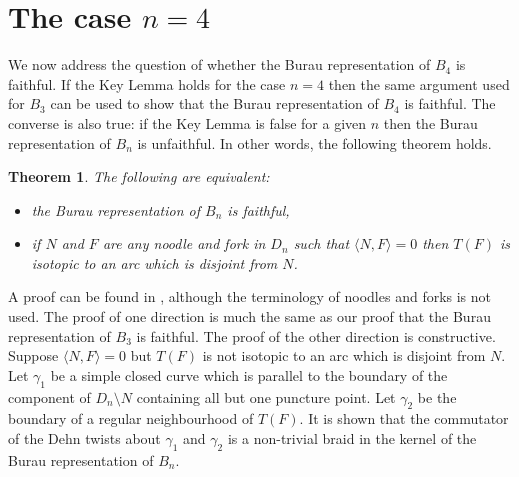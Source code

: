 \documentclass[10pt]{amsart}
\theoremstyle{plain}
\newtheorem{thm}{Theorem}[section]
\theoremstyle{definition}
\begin{document}
\section{The case $n=4$}

We now address the question
of whether the Burau representation of $B_4$ is faithful.
If the Key Lemma holds for the case $n=4$
then the same argument used for $B_3$
can be used to show that the Burau representation of $B_4$ is faithful.
The converse is also true:
if the Key Lemma is false for a given $n$
then the Burau representation of $B_n$ is unfaithful.
In other words, the following theorem holds.

\begin{thm}
\label{faithful}
The following are equivalent:
\begin{itemize}
\item the Burau representation of $B_n$ is faithful,
\item if $N$ and $F$ are any noodle and fork in $D_n$
  such that $\langle N,F \rangle = 0$
  then $T(F)$ is isotopic to an arc which is disjoint from $N$.
\end{itemize}
\end{thm}

A proof can be found in \cite{bigelow:b5},
although the terminology of noodles and forks is not used.
The proof of one direction is much the same as
our proof that the Burau representation of $B_3$ is faithful.
The proof of the other direction is constructive.
Suppose $\langle N,F \rangle = 0$
but $T(F)$ is not isotopic to an arc which is disjoint from $N$.
Let $\gamma_1$ be a simple closed curve
which is parallel to the boundary of
the component of $D_n \setminus N$
containing all but one puncture point.
Let $\gamma_2$ be the boundary of a regular neighbourhood of $T(F)$.
It is shown that 
the commutator of the Dehn twists about $\gamma_1$ and $\gamma_2$
is a non-trivial braid in the kernel of the Burau representation of $B_n$.
\end{document}
